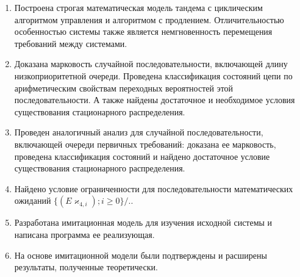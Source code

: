 \documentclass{report}
\begin{document}
    \begin{enumerate}
        \item Построена строгая математическая модель тандема с циклическим алгоритмом управления и алгоритмом с продлением. Отличительностью особенностью системы также является немгновенность перемещения требований между системами. 
        \item Доказана марковость случайной последовательности, включающей длину низкоприоритетной очереди. Проведена классификация состояний цепи по арифметическим свойствам переходных вероятностей этой последовательности. А также найдены достаточное и необходимое условия существования стационарного распределения.
        \item Проведен аналогичный анализ для случайной последовательности, включающей очереди первичных требований: доказана ее марковость, проведена классификация состояний и найдено достаточное условие существования стационарного распределения.
        \item Найдено условие ограниченности для последовательности математических ожиданий $    \{( E\varkappa_{4,i}); i \geqslant 0\}/. 
$.
        \item Разработана имитационная модель для изучения исходной системы и написана программа ее реализующая.
        \item На основе имитационной модели были подтверждены и расширены результаты, полученные теоретически.
    \end{enumerate}
\end{document}
